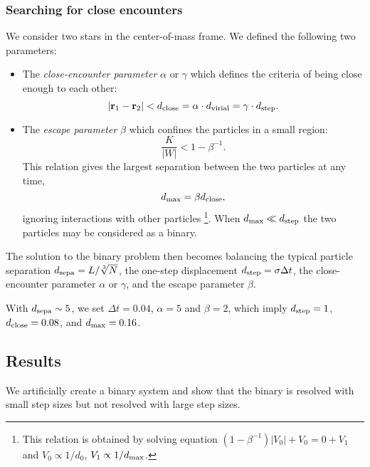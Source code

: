 \subsubsection*{Searching for close encounters}
We consider two stars in the center-of-mass frame. We defined the following two 
parameters:
\begin{itemize}
	\item The \textit{close-encounter parameter} $ \alpha $ or $ \gamma $ which defines the 
	criteria of being close enough to each other:
	\begin{equation}\label{eq:r12}
	| \mathbf{r}_1 - \mathbf{r}_2 | < d_{\rm close} = \alpha \cdot d_{\rm virial} = \gamma \cdot d_{\rm step}.
	\end{equation}
	\item The \textit{escape parameter} $ \beta $ which confines the particles in a small 
	region:
	\begin{equation}\label{key}
	\frac{K}{|W|} < 1 - \beta^{-1}.
	\end{equation}
	This relation gives the largest separation between the two particles at any time, 
	\begin{equation}
	d_{\rm max} = \beta d_{\rm close},
	\end{equation}
	ignoring interactions with other particles
	\footnote{This relation is obtained by solving  equation $ (1 - \beta^{-1}) |V_0| + V_0 = 0 
	+ V_1 $ and $ V_0 \propto 1/d_0 $,	$ V_1 \propto 1/d_{\rm max} $.}.
	When $ d_{\rm max} \ll d_{\rm step} $ the two particles may be considered as a 
	binary.
\end{itemize}

The solution to the binary problem then becomes balancing the typical particle 
separation $ d_{\rm sepa} = L/\sqrt[3]{N} $, the one-step displacement $ d_{\rm 
step} = \sigma \Delta t $, the close-encounter parameter $ \alpha $ or $ \gamma $, and 
the escape parameter $ \beta $.

With $ d_{\rm sepa} \sim 5 $, we set $ \Delta t = 0.04 $, $ \alpha = 5 $ and $ \beta = 2 $, 
which imply $ d_{\rm step} = 1 $, $ d_{\rm close} = 0.08 $, and $ d_{\rm max} = 0.16 $.

\subsection{Results}
We artificially create a binary system and show that the binary is resolved with small step 
sizes but not resolved with large step sizes.

